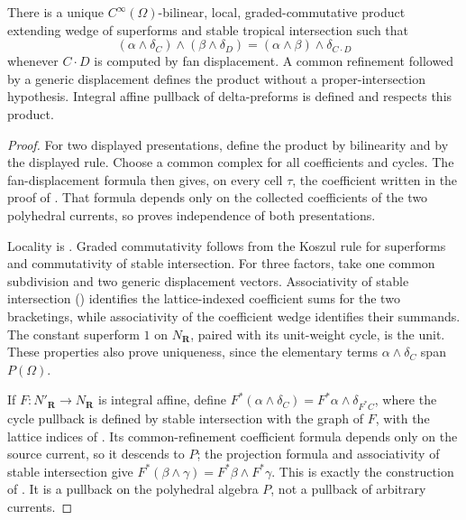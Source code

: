 \begin{theorem}\label{thm:delta-preform-algebra}
There is a unique $C^\infty(\Omega)$-bilinear, local,
graded-commutative product extending wedge of superforms and stable tropical
intersection such that
\[
 (\alpha\wedge\delta_C)\wedge(\beta\wedge\delta_D)
       =(\alpha\wedge\beta)\wedge\delta_{C\cdot D}
\]
whenever $C\cdot D$ is computed by fan displacement.  A common refinement
followed by a generic displacement defines the product without a
proper-intersection hypothesis.  Integral affine pullback of delta-preforms
is defined and respects this product.
\end{theorem}
\begin{proof}
For two displayed presentations, define the product by bilinearity and by
the displayed rule.  Choose a common complex for all coefficients and
cycles.  The fan-displacement formula then gives, on every cell $\tau$, the
coefficient written in the proof of
.  That formula depends only on the
collected coefficients of the two polyhedral currents, so
 proves independence of both
presentations.

Locality is .  Graded commutativity follows
from the Koszul rule for superforms and commutativity of stable
intersection.  For three factors, take one common subdivision and two
generic displacement vectors.  Associativity of stable intersection
() identifies the lattice-indexed
coefficient sums for the two bracketings, while associativity of the
coefficient wedge identifies their summands.  The constant superform $1$
on $N_{\mathbf R}$, paired with its unit-weight cycle, is the unit.  These
properties also prove uniqueness, since the elementary terms
$\alpha\wedge\delta_C$ span $P(\Omega)$.

If $F:N'_{\mathbf R}\to N_{\mathbf R}$ is integral affine, define
$F^*(\alpha\wedge\delta_C)=F^*\alpha\wedge\delta_{F^*C}$, where the cycle
pullback is defined by stable intersection with the graph of $F$, with the
lattice indices of \cite[\S1.4(v)]{GK17}.  Its common-refinement
coefficient formula depends only on the source current, so it descends to
$P$; the projection formula and associativity of stable intersection give
$F^*(\beta\wedge\gamma)=F^*\beta\wedge F^*\gamma$.  This is exactly the
construction of \cite[Proposition~2.12]{GK17}.  It is a pullback on the
polyhedral algebra $P$, not a pullback of arbitrary currents.
\end{proof}

